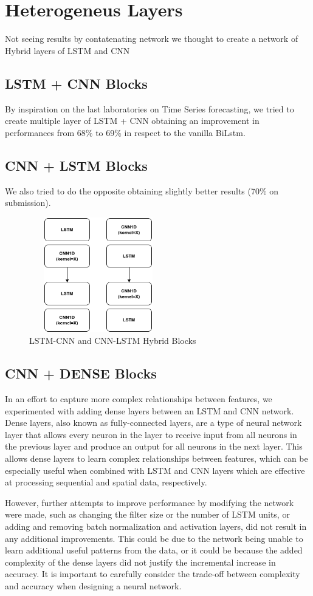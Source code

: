 \documentclass[11pt]{article}
\begin{document}
\section{Heterogeneus Layers}
Not seeing results by contatenating network we thought to create a network of Hybrid layers of LSTM and CNN
\subsection{LSTM + CNN Blocks}
By inspiration on the last laboratories on Time Series forecasting, we tried to create multiple layer of LSTM + CNN
obtaining an improvement in performances from 68\% to 69\% in respect to the vanilla BiLstm.
\subsection{CNN + LSTM Blocks}
We also tried to do the opposite obtaining slightly better results (70\% on submission).
\begin{figure}[h]
  \centering
  \includegraphics[width=6cm, height=5cm]{LSTMCNN}
  \caption{LSTM-CNN and CNN-LSTM Hybrid Blocks}
\end{figure}

\subsection{CNN + DENSE Blocks}
In an effort to capture more complex relationships between features, we experimented with adding dense layers between an LSTM and CNN network.
Dense layers, also known as fully-connected layers, are a type of neural network layer that allows every neuron in the layer to receive input from all neurons in the previous layer and produce an output for all neurons in the next layer.
This allows dense layers to learn complex relationships between features, which can be especially useful when combined with LSTM and CNN layers which are effective at processing sequential and spatial data, respectively.

However, further attempts to improve performance by modifying the network were made, such as changing the filter size or the number of LSTM units, or adding and removing batch normalization and activation layers, did not result in any additional improvements.
This could be due to the network being unable to learn additional useful patterns from the data, or it could be because the added complexity of the dense layers did not justify the incremental increase in accuracy.
It is important to carefully consider the trade-off between complexity and accuracy when designing a neural network.
\end{document}
